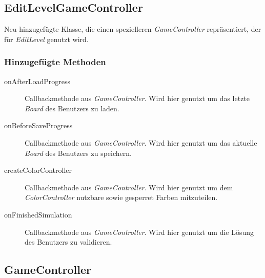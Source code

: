 \subsection{EditLevelGameController}
Neu hinzugefügte Klasse, die einen spezielleren \emph{GameController} repräsentiert, der für \emph{EditLevel} genutzt wird.

\subsubsection{Hinzugefügte Methoden}
\begin{description}
\item[onAfterLoadProgress]
Callbackmethode aus \emph{GameController}.
Wird hier genutzt um das letzte \emph{Board} des Benutzers zu laden.

\item[onBeforeSaveProgress]
Callbackmethode aus \emph{GameController}.
Wird hier genutzt um das aktuelle \emph{Board} des Benutzers zu speichern.

\item[createColorController]
Callbackmethode aus \emph{GameController}.
Wird hier genutzt um dem \emph{ColorController} nutzbare sowie gesperret Farben mitzuteilen.

\item[onFinishedSimulation]
Callbackmethode aus \emph{GameController}.
Wird hier genutzt um die Lösung des Benutzers zu validieren.

\end{description}


\subsection{GameController}


